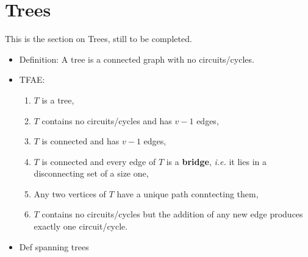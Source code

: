 \section{Trees}\label{sec:trees}

This is the section on Trees, still to be completed.

\begin{itemize}
    \item Definition: A tree is a connected graph with no circuits/cycles.
    \item TFAE:
    \begin{enumerate}
        \item $T$ is a tree,
        \item $T$ contains no circuits/cycles and has $v-1$ edges,
        \item $T$ is connected and has $v-1$ edges,
        \item $T$ is connected and every edge of $T$ is a \textbf{bridge}, \textit{i.e.} it lies in a disconnecting set of a size one,
        \item Any two vertices of $T$ have a unique path conntecting them,
        \item $T$ contains no circuits/cycles but the addition of any new edge produces exactly one circuit/cycle.
    \end{enumerate}
    \item Def spanning trees





\end{itemize}
